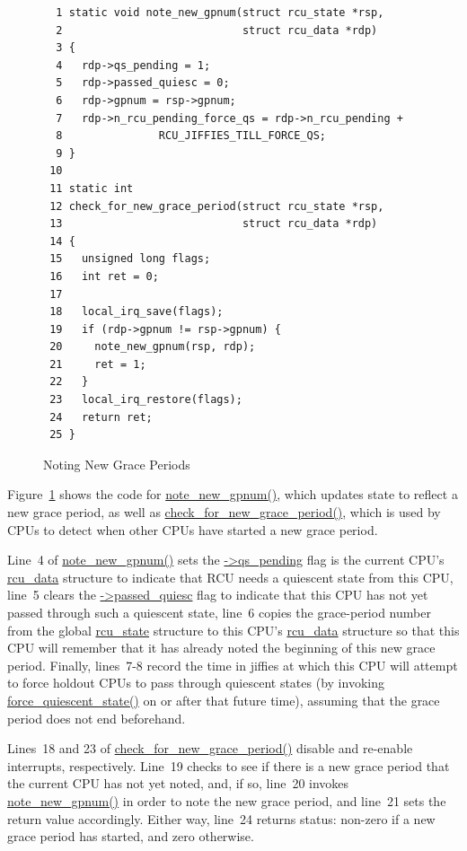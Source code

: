 \begin{figure}[tbp]
{ \scriptsize
\begin{verbatim}
  1 static void note_new_gpnum(struct rcu_state *rsp,
  2                            struct rcu_data *rdp)
  3 {
  4   rdp->qs_pending = 1;
  5   rdp->passed_quiesc = 0;
  6   rdp->gpnum = rsp->gpnum;
  7   rdp->n_rcu_pending_force_qs = rdp->n_rcu_pending +
  8               RCU_JIFFIES_TILL_FORCE_QS;
  9 }
 10 
 11 static int
 12 check_for_new_grace_period(struct rcu_state *rsp,
 13                            struct rcu_data *rdp)
 14 {
 15   unsigned long flags;
 16   int ret = 0;
 17 
 18   local_irq_save(flags);
 19   if (rdp->gpnum != rsp->gpnum) {
 20     note_new_gpnum(rsp, rdp);
 21     ret = 1;
 22   }
 23   local_irq_restore(flags);
 24   return ret;
 25 }
\end{verbatim}
}
\caption{Noting New Grace Periods}
\label{fig:app:rcuimpl:rcutreewt:Noting New Grace Periods}
\end{figure}

Figure~\ref{fig:app:rcuimpl:rcutreewt:Noting New Grace Periods}
shows the code for \url{note_new_gpnum()}, which updates state to reflect
a new grace period, as well as \url{check_for_new_grace_period()}, which
is used by CPUs to detect when other CPUs have started a new grace period.

Line~4 of \url{note_new_gpnum()} sets the \url{->qs_pending} flag is
the current CPU's \url{rcu_data} structure to indicate that RCU needs
a quiescent state from this CPU, line~5 clears the \url{->passed_quiesc}
flag to indicate that this CPU has not yet passed through such a
quiescent state,
line~6 copies the grace-period number from the global \url{rcu_state}
structure to this CPU's \url{rcu_data} structure so that this CPU will
remember that it has already noted the beginning of this new grace
period.
Finally, lines~7-8 record the time in jiffies at which this CPU
will attempt to force holdout CPUs to pass through quiescent states
(by invoking \url{force_quiescent_state()} on or after that future time),
assuming that the grace period does not end beforehand.

Lines~18 and 23 of \url{check_for_new_grace_period()} disable and
re-enable interrupts, respectively.
Line~19 checks to see if there is a new grace period that the current
CPU has not yet noted, and, if so, line~20 invokes \url{note_new_gpnum()}
in order to note the new grace period, and line~21 sets the return value
accordingly.
Either way, line~24 returns status: non-zero if a new grace period has
started, and zero otherwise.

